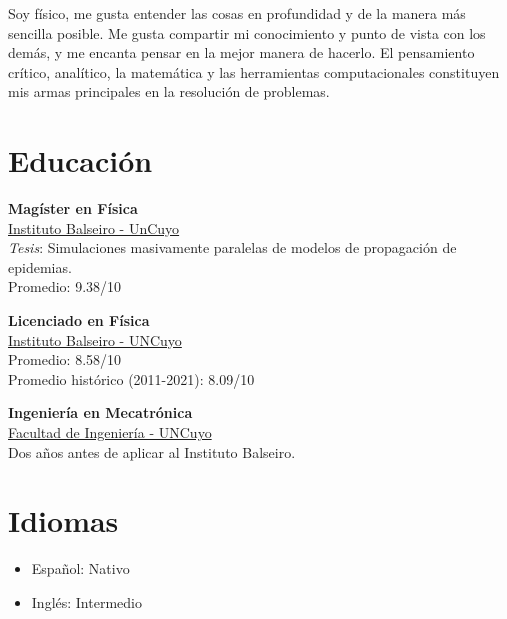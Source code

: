 \documentclass[a4paper,10pt]{article}
\begin{document}
\begin{adjustbox}{valign=t}
\begin{minipage}{.44\textwidth}
Soy físico, me gusta entender las cosas en profundidad y de la manera
más sencilla posible. Me gusta compartir mi conocimiento y punto de vista 
con los demás, y me encanta pensar en la mejor manera de hacerlo. El 
pensamiento crítico, analítico, la matemática y las herramientas 
computacionales constituyen mis armas principales en la resolución de 
problemas.
\vspace*{-.5cm}
\section*{Educación}
	\begin{description}
	\raggedright
	
    \item [\normalfont \textcolor{ColorOne}{Ago. 2021 - Dic. 2022.}] \textbf{Magíster en Física}\\
	\href{https://www.ib.edu.ar/}{\textcolor{ColorTwo}{Instituto Balseiro - UnCuyo}}\\
    \textit{Tesis}: Simulaciones masivamente paralelas de modelos de propagación de epidemias. \\
	Promedio: 9.38/10
	

	\item [\normalfont \textcolor{ColorOne}{Ago. 2019 - Dic. 2021.}] \textbf{Licenciado en Física}\\
	\href{https://www.ib.edu.ar/}{\textcolor{ColorTwo}{Instituto Balseiro - UNCuyo}}\\
	Promedio: 8.58/10\\
	Promedio histórico (2011-2021): 8.09/10
    

	\item [\normalfont \textcolor{ColorOne}{Mar. 2017 - Dic. 2018.}] \textbf{Ingeniería en Mecatrónica}\\ 
	\href{https://ingenieria.uncuyo.edu.ar/}{\textcolor{ColorTwo}{Facultad de Ingeniería - UNCuyo}}\\
    Dos años antes de aplicar al Instituto Balseiro.

	\end{description}
\vspace*{-.8cm}
\section*{Idiomas}
\begin{itemize}
	\raggedright
	\item Español: Nativo
	\item Inglés: Intermedio
\end{itemize}

\vfill
\end{minipage}
\end{adjustbox}
\end{document}
